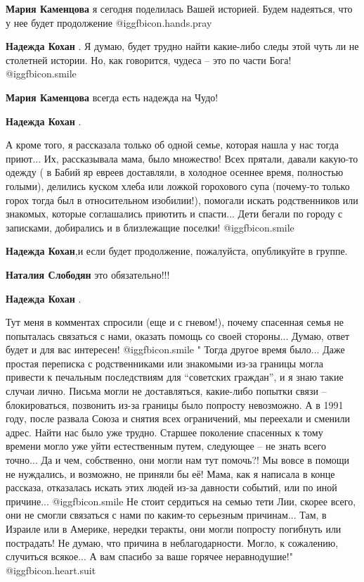 \begin{itemize}
\begin{itemize}
\begin{itemize}
\textbf{Мария Каменцова} я сегодня поделилась Вашей историей. Будем надеяться, что у нее будет продолжение @igg{fbicon.hands.pray} 

\textbf{Надежда Кохан} . Я думаю, будет трудно найти какие-либо следы этой чуть ли не столетней истории. Но, как говорится, чудеса – это по части Бога!  @igg{fbicon.smile} 

\textbf{Мария Каменцова} всегда есть надежда на Чудо!

\textbf{Надежда Кохан} . 

А кроме того, я рассказала только об одной семье, которая нашла у нас тогда
приют... Их, рассказывала мама, было множество! Всех прятали, давали какую-то
одежду ( в Бабий яр евреев доставляли, в холодное осеннее время, полностью
голыми), делились куском хлеба или ложкой горохового супа (почему-то только
горох тогда был в относительном изобилии!), помогали искать родственников или
знакомых, которые соглашались приютить и спасти... Дети бегали по городу с
записками, добирались и в близлежащие поселки!  @igg{fbicon.smile} 

\end{itemize} %

\textbf{Надежда Кохан},и если будет продолжение, пожалуйста, опубликуйте в группе.

\textbf{Наталия Слободян} это обязательно!!!

\textbf{Надежда Кохан} . 

Тут меня в комментах спросили (еще и с гневом!), почему спасенная семья не
попыталась связаться с нами, оказать помощь со своей стороны... Думаю, ответ
будет и для вас интересен!  @igg{fbicon.smile}  " Тогда другое время было... Даже простая
переписка с родственниками или знакомыми из-за границы могла привести к
печальным последствиям для \enquote{советских граждан}, и я знаю такие случаи лично.
Письма могли не доставляться, какие-либо попытки связи – блокироваться,
позвонить из-за границы было попросту невозможно. А в 1991 году, после развала
Союза и снятия всех ограничений, мы переехали и сменили адрес. Найти нас было
уже трудно. Старшее поколение спасенных к тому времени могло уже уйти
естественным путем, следующее – не знать всего точно... Да и чем, собственно,
они могли нам тут помочь?! Мы вовсе в помощи не нуждались, и возможно, не
приняли бы её! Мама, как я написала в конце рассказа, отказалась искать этих
людей из-за давности событий, или по иной причине...  @igg{fbicon.smile}  Не стоит сердиться на
семью тети Лии, скорее всего, они не смогли связаться с нами по каким-то
серьезным причинам... Там, в Израиле или в Америке, нередки теракты, они могли
попросту погибнуть или пострадать! Не думаю, что причина в неблагодарности.
Могло, к сожалению, случиться всякое... А вам спасибо за ваше горячее
неравнодушие!" @igg{fbicon.heart.suit}


\end{itemize}
\end{itemize}
